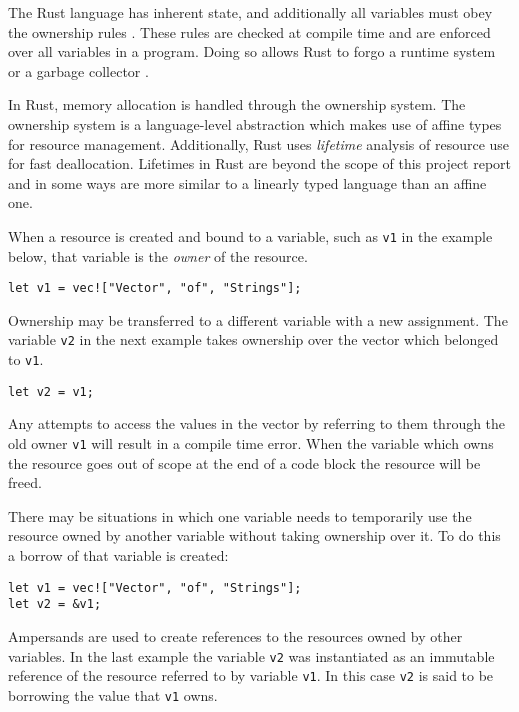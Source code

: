 \documentclass[onehalf,11pt]{beavtex}
\begin{document}
The Rust language has inherent state, and additionally all variables must obey
the ownership rules \cite{rust_book_ownership}.
These rules are checked at compile time and are enforced over all variables in
a program.
Doing so allows Rust to forgo a runtime system \cite{rust_runtime_faq}
or a garbage collector \cite{rust_gc_faq}.

In Rust, memory allocation is handled through the ownership system.
The ownership system is a language-level abstraction which makes use of
affine types for resource management.
Additionally, Rust uses \textit{lifetime} analysis of resource use for fast
deallocation. Lifetimes in Rust are beyond the scope of this project report and
in some ways are more similar to a linearly typed language than an affine one.

When a resource is created and bound to a variable, such as \texttt{v1} in the
example below, that variable is the \textit{owner} of the resource.

\begin{verbatim}
let v1 = vec!["Vector", "of", "Strings"];
\end{verbatim}

Ownership may be transferred to a different variable with a new assignment.
The variable \texttt{v2} in the next example takes ownership over the
vector which belonged to \texttt{v1}. 

\begin{verbatim}
let v2 = v1;
\end{verbatim}

Any attempts to access the values in the vector by referring to them through
the old owner \texttt{v1} will result in a compile time error.
When the variable which owns the resource goes out of scope at the end of a
code block the resource will be freed.

There may be situations in which one variable needs to temporarily
use the resource owned by another variable without taking ownership over it.
To do this a borrow of that variable is created:

\begin{verbatim}
let v1 = vec!["Vector", "of", "Strings"];
let v2 = &v1;
\end{verbatim}

Ampersands are used to create references to the resources owned by other
variables.
In the last example the variable \texttt{v2} was instantiated as an immutable
reference of the resource referred to by variable \texttt{v1}.
In this case \texttt{v2} is said to be borrowing the value
that \texttt{v1} owns.
\end{document}
